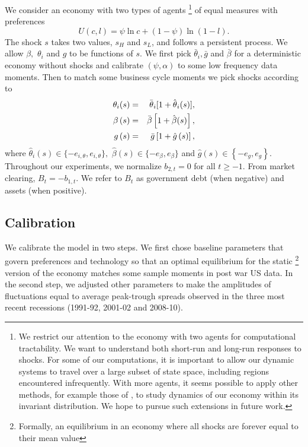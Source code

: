 \documentclass[thmsb,11pt]{article}
\begin{document}
{\smallskip We consider an economy with two types of agents%
\footnote{%
We restrict our attention to the economy with two agents for computational
tractability. We want to understand both short-run and long-run
responses to shocks.  For some of our computations,  it is important to allow our
dynamic systems to travel over a large subset of state space, including regions encountered infrequently.
With more agents, it seems  possible to apply other methods,  for example those of  \cite{Judd2011}, to study dynamics of our economy within its invariant
distribution. We hope to pursue such extensions in  future work.}
of equal measures with preferences%
\begin{equation*}
U\left( c,l\right) =\psi \ln c+\left( 1-\psi \right) \ln \left( 1-l\right) .
\end{equation*}%
The shock $s$   takes two values, $s_{H}$ and $s_{L}$, and follows a persistent
process. We allow $\beta ,$ $\theta _{i}$ and $g$ to be
functions of $s.$ We first pick $\bar{\theta}_{i},\bar{g}$
and $\bar{\beta}$ for a deterministic economy without shocks and calibrate $%
\left( \psi ,\alpha \right) $ to some low frequency  data moments. Then to match some business cycle moments we
pick shocks  according to
\begin{eqnarray}\label{eqn:newstar}
\theta _{i}(s) &=&\bar{\theta}_{i}[1+{\hat{\theta}}_{i}(s)], \cr
\beta \left( s\right) &=&\bar{\beta}\left[ 1+\hat{\beta}(s)\right] , \cr
g\left( s\right) &=&\bar{g}\left[ 1+\hat{g}\left( s\right) \right] ,
\end{eqnarray}%
where $\hat{\theta}_{i}\left( s\right) \in \{-e_{i,\theta },e_{i,\theta }\},$
$\hat{\beta}\left( s\right) \in \{-e_{\beta },e_{\beta }\}$ and $\hat{g}%
\left( s\right) \in \left\{ -e_{g},e_{g}\right\} .$ Throughout  our
experiments, we normalize $b_{2,t}=0$ for all $t\geq -1$. From market
clearing,  $B_{t}=-b_{1,t}$.  We refer to $B_{t}$ as
government debt (when negative) and  assets (when positive).

\smallskip

\subsection{\protect\smallskip Calibration}

\smallskip We calibrate the model in two steps. We first chose baseline parameters
that govern preferences and technology so  that an optimal equilibrium for the static%
\footnote{%
Formally, an equilibrium in an economy where all shocks are forever equal to their
mean value} version of the economy matches some sample moments in post war US data.  In the second step, we adjusted other parameters  to make the amplitudes of
fluctuations equal to average peak-trough spreads observed in
the  three most recent recessions (1991-92, 2001-02 and 2008-10).

}
\end{document}
